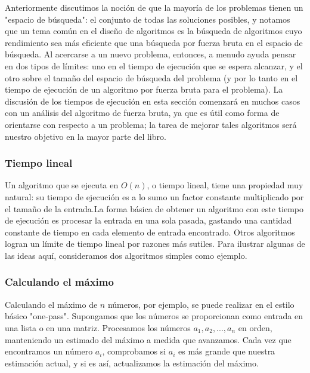 \documentclass[a4paper, 12pt]{book}
\theoremstyle{dotless}
\begin{document}
Anteriormente discutimos la noción de que la mayoría de los problemas tienen un "espacio de búsqueda": el conjunto de todas las soluciones posibles, y notamos que un tema común en el diseño de algoritmos es la búsqueda de algoritmos cuyo rendimiento sea más eficiente que una búsqueda por fuerza bruta en el espacio de búsqueda. Al acercarse a un nuevo problema, entonces, a menudo ayuda pensar en dos tipos de límites: uno en el tiempo de ejecución que se espera alcanzar, y el otro sobre el tamaño del espacio de búsqueda del problema (y por lo tanto en el tiempo de ejecución de un algoritmo por fuerza bruta para el problema). La discusión de los tiempos de ejecución en esta sección comenzará en muchos casos con un análisis del algoritmo de fuerza bruta, ya que es útil como forma de orientarse con respecto a un problema; la tarea de mejorar tales algoritmos será nuestro objetivo en la mayor parte del libro.\\

\subsubsection*{Tiempo lineal} 

Un algoritmo que se ejecuta en $O(n)$, o tiempo lineal, tiene una propiedad muy natural: su tiempo de ejecución es a lo sumo un factor constante multiplicado por el tamaño de la entrada.La forma básica de obtener un algoritmo con este tiempo de ejecución es procesar la entrada en una sola pasada, gastando una cantidad constante de tiempo en cada elemento de entrada encontrado. Otros algoritmos logran un límite de tiempo lineal por razones más sutiles. Para ilustrar algunas de las ideas aquí, consideramos dos algoritmos simples como ejemplo.\\

\subsubsection*{Calculando el máximo}

Calculando el máximo de $n$ números, por ejemplo, se puede realizar en el estilo básico "one-pass". Supongamos que los números se proporcionan como entrada en una lista o en una matriz. Procesamos los números $a_1, a_2,. . ., a_n$ en orden, manteniendo un estimado del máximo a medida que avanzamos. Cada vez que encontramos un número $a_i$, comprobamos si $a_i$ es más grande que nuestra estimación actual, y si es así, actualizamos la estimación del máximo.\\
\end{document}
